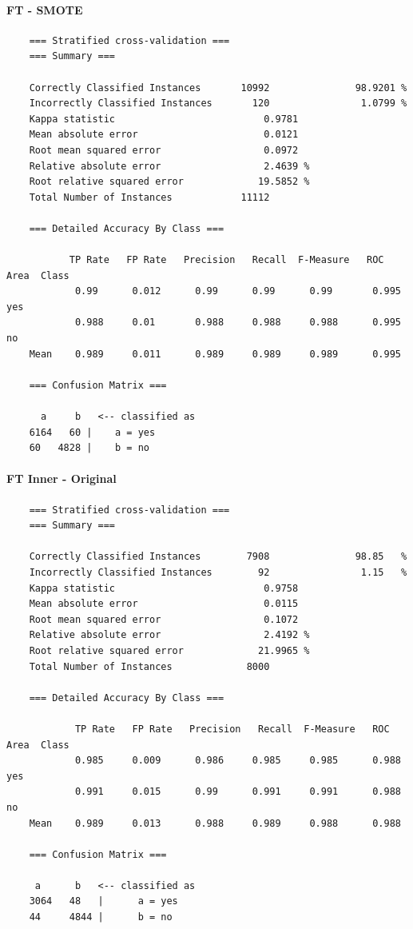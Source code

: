 \paragraph{FT - SMOTE}
{\footnotesize
	\begin{verbatim}
	=== Stratified cross-validation ===
	=== Summary ===
	
	Correctly Classified Instances       10992               98.9201 %
	Incorrectly Classified Instances       120                1.0799 %
	Kappa statistic                          0.9781
	Mean absolute error                      0.0121
	Root mean squared error                  0.0972
	Relative absolute error                  2.4639 %
	Root relative squared error             19.5852 %
	Total Number of Instances            11112     
	
	=== Detailed Accuracy By Class ===
	
	       TP Rate   FP Rate   Precision   Recall  F-Measure   ROC Area  Class
	        0.99      0.012      0.99      0.99      0.99       0.995    yes
	        0.988     0.01       0.988     0.988     0.988      0.995    no
	Mean    0.989     0.011      0.989     0.989     0.989      0.995
	
	=== Confusion Matrix ===
	
	  a     b   <-- classified as
	6164   60 |    a = yes
	60   4828 |    b = no
	\end{verbatim}
}

\paragraph{FT Inner - Original}
{\footnotesize
	\begin{verbatim}
	=== Stratified cross-validation ===
	=== Summary ===
	
	Correctly Classified Instances        7908               98.85   %
	Incorrectly Classified Instances        92                1.15   %
	Kappa statistic                          0.9758
	Mean absolute error                      0.0115
	Root mean squared error                  0.1072
	Relative absolute error                  2.4192 %
	Root relative squared error             21.9965 %
	Total Number of Instances             8000     
	
	=== Detailed Accuracy By Class ===
	
	        TP Rate   FP Rate   Precision   Recall  F-Measure   ROC Area  Class
	        0.985     0.009      0.986     0.985     0.985      0.988    yes
	        0.991     0.015      0.99      0.991     0.991      0.988    no
	Mean    0.989     0.013      0.988     0.989     0.988      0.988
	
	=== Confusion Matrix ===
	
	 a      b   <-- classified as
	3064   48   |      a = yes
	44     4844 |      b = no
	\end{verbatim}
}

